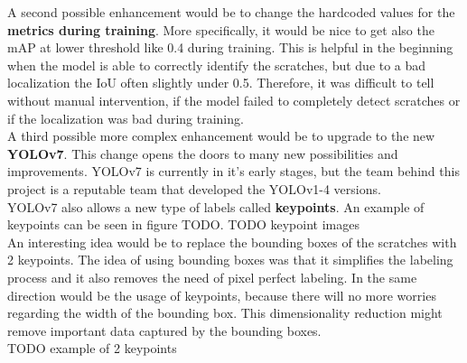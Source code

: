 A second possible enhancement would be to change the hardcoded values for the \textbf{metrics during training}. More specifically, it would be nice to get also the mAP at lower threshold like 0.4 during training. This is helpful in the beginning when the model is able to correctly identify the scratches, but due to a bad localization the IoU often slightly under 0.5. Therefore, it was difficult to tell without manual intervention, if the model failed to completely detect scratches or if the localization was bad during training. \\
A third possible more complex enhancement would be to upgrade to the new \textbf{YOLOv7}. This change opens the doors to many new possibilities and improvements. YOLOv7 is currently in it's early stages, but the team behind this project is a reputable team that developed the YOLOv1-4 versions.\\
 YOLOv7 also allows a new type of labels called \textbf{keypoints}. An example of keypoints can be seen in figure TODO.
TODO keypoint images \\
An interesting idea would be to replace the bounding boxes of the scratches with 2 keypoints. The idea of using bounding boxes was that it simplifies the labeling process and it also removes the need of pixel perfect labeling. In the same direction would be the usage of keypoints, because there will no more worries regarding the width of the bounding box. This dimensionality reduction might remove important data captured by the bounding boxes. \\
TODO example of 2 keypoints \\
